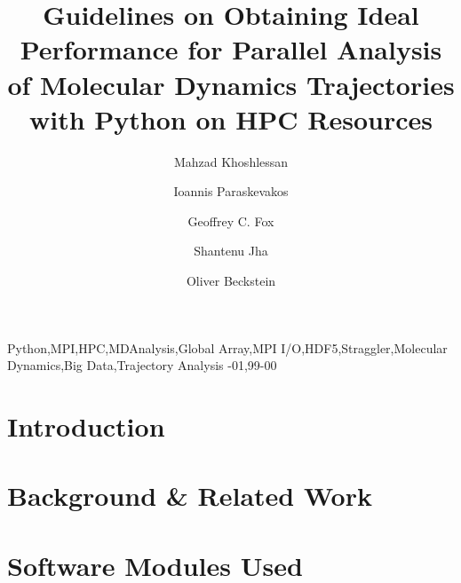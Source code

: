 \documentclass[review]{elsarticle}
\begin{document}
\begin{frontmatter}    

\title{Guidelines on Obtaining Ideal Performance for Parallel Analysis of Molecular Dynamics Trajectories with Python on HPC Resources}

\author[ASUphysics]{Mahzad Khoshlessan}

\author[Rutgers]{Ioannis Paraskevakos}

\author[IndianaDSC]{Geoffrey C. Fox}

\author[Rutgers]{Shantenu Jha}

\author[ASUphysics,ASUCBP]{Oliver Beckstein}

\address[ASUphysics]{Department of Physics, Arizona State University,
  Tempe, AZ 85281, USA}
\address[ASUCBP]{Center for Biological Physics, Arizona State University,
  Tempe, AZ 85281, USA}
\address[Rutgers]{Department of Electrical \& Computer Engineering,
  Rutgers University, Piscataway, NJ 08854, USA}
\address[IndianaDSC]{Digital Science Center, Indiana University,
  Bloomington, IN 47405}

    


\begin{keyword}
Python\sep MPI\sep HPC\sep MDAnalysis\sep Global Array\sep MPI I/O\sep HDF5\sep Straggler\sep Molecular Dynamics\sep Big Data\sep Trajectory Analysis
-01\sep  99-00
\end{keyword}

\end{frontmatter}

\linenumbers

\section{Introduction}


\section{Background \& Related Work}


\section{Software Modules Used}

\end{document}
